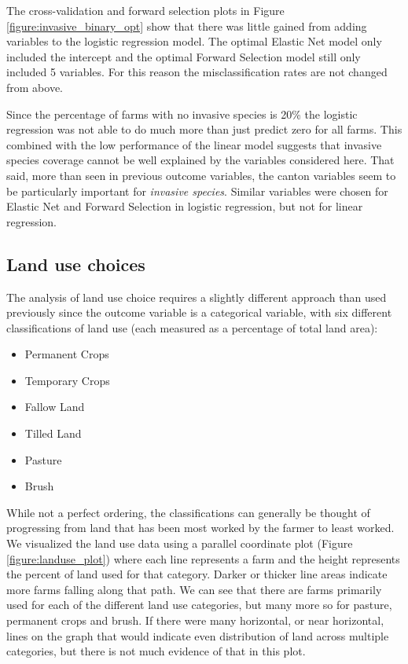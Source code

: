 \documentclass{article}
\begin{document}
The cross-validation and forward selection plots in Figure \ref{figure:invasive_binary_opt} show that there was little gained from 
adding variables to the logistic regression model. The optimal Elastic Net model only included the intercept and the optimal 
Forward Selection model still only included 5 variables. For this reason the misclassification rates are not changed from above. 

Since the percentage of farms with no invasive species is 20{\%} the logistic regression was not able to do much more than just 
predict zero for all farms. This combined with the low performance of the linear model suggests that invasive species coverage cannot be well explained by the variables considered here. That said, more than seen in previous outcome variables, the canton variables seem to be particularly important for \textit{invasive species}. Similar variables were chosen for Elastic Net and Forward Selection in logistic regression, but not for linear regression.

\subsection{Land use choices}

The analysis of land use choice requires a slightly different approach than used previously since the outcome variable is a 
categorical variable, with six different classifications of land use (each measured as a percentage of total land area):
\begin{itemize}
	\item{Permanent Crops}
	\item{Temporary Crops}
	\item{Fallow Land}
	\item{Tilled Land}
	\item{Pasture}
	\item{Brush}
\end{itemize}

While not a perfect ordering, the classifications can generally be thought of progressing from land that has been most worked 
by the farmer to least worked. We visualized the land use data using a parallel coordinate plot (Figure 
\ref{figure:landuse_plot}) where each line represents a farm and the height represents the percent of land used for that 
category. Darker or thicker line areas indicate more farms falling along that path. We can see that there are farms primarily 
used for each of the different land use categories, but many more so for pasture, permanent crops and brush. If there were 
many horizontal, or near horizontal, lines on the graph that would indicate even distribution of land across multiple categories, 
but there is not much evidence of that in this plot.
\end{document}
